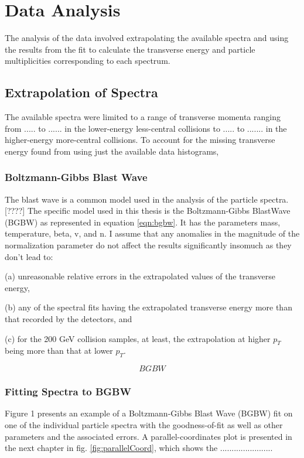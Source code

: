 \chapter{Data Analysis} \label{ch:analysis}
The analysis of the data involved extrapolating the available spectra and using the results from the fit to calculate the transverse energy and particle multiplicities corresponding to each spectrum. 
\section{Extrapolation of Spectra}
The available spectra were limited to a range of transverse momenta ranging from ..... to ...... in the lower-energy less-central collisions to  ..... to ....... in the higher-energy more-central collisions. To account for the missing transverse energy found from using just the available data histograms,
\subsection{Boltzmann-Gibbs Blast Wave}
The blast wave is a common model used in the analysis of the particle spectra.[????] The specific model used in this thesis is the Boltzmann-Gibbs BlastWave (BGBW) as represented in equation \ref{eqn:bgbw}. It has the parameters mass, temperature, beta, v, and n. I assume that any anomalies in the magnitude of the normalization parameter do not affect the results significantly insomuch as they don't lead to: 

(a) unreasonable relative errors in the extrapolated values of the transverse energy,

(b) any of the spectral fits having the extrapolated transverse energy more than that recorded by the detectors, and

(c) for the 200 GeV collision samples, at least, the extrapolation at higher $p_{T}$ being more than that at lower $p_{T}$.

	\begin{equation}\label{eqn:BGBW}
	BGBW
	\end{equation}

\subsection{Fitting Spectra to BGBW}
Figure 1 presents an example of a Boltzmann-Gibbs Blast Wave (BGBW) fit on one of the individual particle spectra with the goodness-of-fit as well as other parameters and the associated errors. A parallel-coordinates plot is presented in the next chapter in fig. \ref{fig:parallelCoord}, which shows the ....................... 

